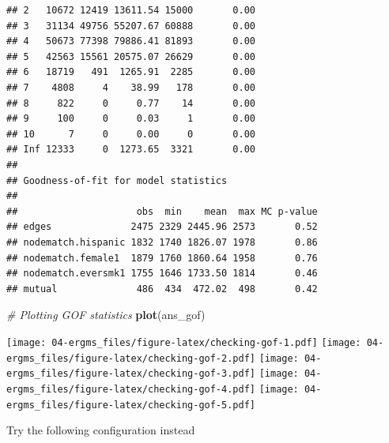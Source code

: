 \documentclass[]{book}
\newenvironment{Shaded}{\begin{snugshade}}{\end{snugshade}}
\newcommand{\CommentTok}[1]{\textcolor[rgb]{0.56,0.35,0.01}{\textit{#1}}}
\newcommand{\KeywordTok}[1]{\textcolor[rgb]{0.13,0.29,0.53}{\textbf{#1}}}
\newcommand{\NormalTok}[1]{#1}
\begin{document}
\begin{verbatim}
## 2   10672 12419 13611.54 15000       0.00
## 3   31134 49756 55207.67 60888       0.00
## 4   50673 77398 79886.41 81893       0.00
## 5   42563 15561 20575.07 26629       0.00
## 6   18719   491  1265.91  2285       0.00
## 7    4808     4    38.99   178       0.00
## 8     822     0     0.77    14       0.00
## 9     100     0     0.03     1       0.00
## 10      7     0     0.00     0       0.00
## Inf 12333     0  1273.65  3321       0.00
## 
## Goodness-of-fit for model statistics 
## 
##                     obs  min    mean  max MC p-value
## edges              2475 2329 2445.96 2573       0.52
## nodematch.hispanic 1832 1740 1826.07 1978       0.86
## nodematch.female1  1879 1760 1860.64 1958       0.76
## nodematch.eversmk1 1755 1646 1733.50 1814       0.46
## mutual              486  434  472.02  498       0.42
\end{verbatim}

\begin{Shaded}
\begin{Highlighting}[]
\CommentTok{# Plotting GOF statistics}
\KeywordTok{plot}\NormalTok{(ans_gof)}
\end{Highlighting}
\end{Shaded}

\texttt{[image: 04-ergms\_files/figure-latex/checking-gof-1.pdf]} \texttt{[image: 04-ergms\_files/figure-latex/checking-gof-2.pdf]} \texttt{[image: 04-ergms\_files/figure-latex/checking-gof-3.pdf]} \texttt{[image: 04-ergms\_files/figure-latex/checking-gof-4.pdf]} \texttt{[image: 04-ergms\_files/figure-latex/checking-gof-5.pdf]}

Try the following configuration instead
\end{document}
